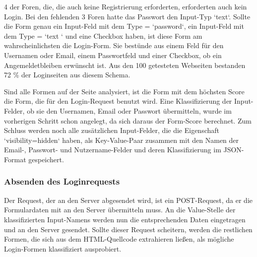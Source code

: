 4 der Foren, die, die auch keine Registrierung erforderten, erforderten auch kein Login. Bei den fehlenden 3 Foren hatte das Passwort den Input-Typ `text`.
Sollte die Form genau ein Input-Feld mit dem Type = `password`, ein Input-Feld mit dem Type = `text ` und eine Checkbox haben, ist diese Form am wahrscheinlichsten die Login-Form. Sie bestünde aus einem Feld für den Usernamen oder Email, einem Passwortfeld und einer Checkbox, ob ein Angemeldetbleiben erwünscht ist. Aus den 100 getesteten Webseiten bestanden 72 \% der Loginseiten aus diesem Schema.

Sind alle Formen auf der Seite analysiert, ist die Form mit dem höchsten Score die Form, die für den Login-Request benutzt wird. Eine Klassifizierung der Input-Felder, ob sie den Usernamen, Email oder Passwort übermitteln, wurde im vorherigen Schritt schon angelegt, da sich daraus der Form-Score berechnet. Zum Schluss werden noch alle zusätzlichen Input-Felder, die die Eigenschaft `visibility=hidden` haben, als Key-Value-Paar zusammen mit den Namen der Email-, Passwort- und Nutzername-Felder und deren Klassifizierung im JSON-Format gespeichert.

\subsubsection{Absenden des Loginrequests}
Der Request, der an den Server abgesendet wird, ist ein POST-Request, da er die Formulardaten mit an den Server übermitteln muss.
An die Value-Stelle der klassifizierten Input-Namens werden nun die entsprechenden Daten eingetragen und an den Server gesendet.
Sollte dieser Request scheitern, werden die restlichen Formen, die sich aus dem HTML-Quellcode extrahieren ließen, als mögliche Login-Formen klassifiziert ausprobiert.

